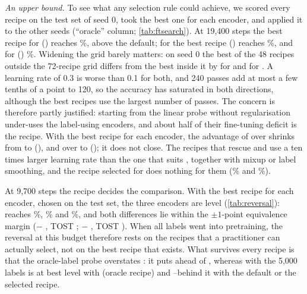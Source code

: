 \emph{An upper bound.} To see what any selection rule could achieve, we scored every recipe on the test set
of seed 0, took the best one for each encoder, and applied it to the other seeds (``oracle'' column;
\cref{tab:ftsearch}). At 19,400 steps the best recipe for \supcon ()
reaches \%, \pt above the default; for \union the
best recipe () reaches \%, and for \simclr
() \%. Widening the grid barely matters: on seed 0 the
best of the 48 recipes outside the 72-recipe grid differs from the best inside it by \pt for
\supcon and \pt for \union. A learning rate of 0.3 is worse than 0.1 for both, and
240 passes add at most a few tenths of a point to 120, so the accuracy has saturated in both directions, although
the best recipes use the largest number of passes. The concern is therefore partly justified: starting from the linear probe
without regularisation under-uses the label-using encoders, and about half of their fine-tuning deficit is the
recipe. With the best recipe for each encoder, the advantage of \simclr over \supcon shrinks from
\pt to \pt (),
and over \union to \pt (); it does not close.
The recipes that rescue \supcon and \union use a ten times larger learning rate than the one that suits
\simclr, together with mixup or label smoothing, and the recipe selected for \simclr does nothing for them
(\% and \%).

At 9,700 steps the recipe decides the comparison. With the best recipe for each encoder, chosen on the test set,
the three encoders are level (\cref{tab:reversal}): \simclr reaches \%, \supcon
{}\% and \union {}\%, and both differences lie within the
$\pm1$-point equivalence margin (\simclr $-$ \supcon {}\pt, TOST
; \simclr $-$ \union {}\pt, TOST
). When all labels went into pretraining, the reversal at this budget
therefore rests on the recipes that a practitioner can actually select, not on the best recipe that exists. What survives every recipe is that the
oracle-label probe overstates \union: it puts \union {}\pt ahead
of \simclr, whereas with the 5,000 labels \union is at best level with \simclr (oracle recipe) and
--\pt behind it with the default or the selected
recipe.

